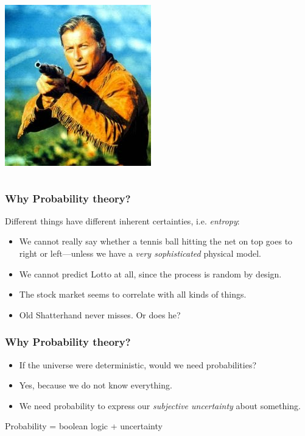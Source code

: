 \documentclass[USenglish,pdftex,compress,10pt,svgnamesi,handout]{beamer}
\begin{document}
\begin{frame}
\begin{columns}[t]
\vspace{1em}

\includegraphics[width=.5\linewidth]{pics/oldshatterhand}
\end{columns}
\end{frame}


\begin{frame}
\frametitle{Why Probability theory?}

Different things have different inherent certainties, i.e. \emph{entropy}:
\begin{itemize}
    \item We cannot really say whether a tennis ball hitting the net on top goes to right or left---unless we have a \emph{very sophisticated} physical model.
    \item We cannot predict Lotto at all, since the process is random by design.
    \item The stock market seems to correlate with all kinds of things.
    \item Old Shatterhand never misses. Or does he?
\end{itemize}
\end{frame}


\begin{frame}
\frametitle{Why Probability theory?}
\begin{itemize}
    \item If the universe were deterministic, would we need probabilities?
    \pause
    \item Yes, because we do not know everything.
    \pause
    \item We need probability to express our \emph{subjective uncertainty} about something.
\end{itemize}
\pause
\center Probability = boolean logic + uncertainty
\end{frame}
\end{document}
